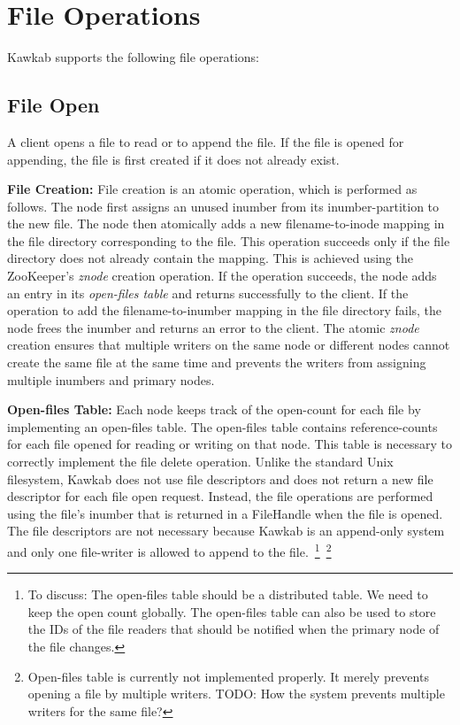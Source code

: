 \documentclass[]{article}
\newcommand{\subtopic}[1]{\vspace{1.5pt} \noindent \textbf{#1}}
\newcommand{\hl}[1]{\textcolor{hlcolor}{#1}}
\begin{document}
\section{File Operations}

Kawkab supports the following file operations:

\subsection{File Open}

A client opens a file to read or to append the file. If the file is opened for
appending, the file is first created if it does not already exist.

\subtopic{File Creation:} File creation is an atomic operation, which is
performed as follows.
The node first assigns an unused inumber from its inumber-partition to the new
file.  The node then atomically adds a new filename-to-inode mapping in the
file directory corresponding to the file. This operation succeeds only if the
file directory does not already contain the mapping. This is achieved using the
ZooKeeper's \textit{znode} creation operation.  If the operation succeeds, the
node adds an entry in its \textit{open-files table} and returns successfully to
the client.  If the operation to add the filename-to-inumber mapping in the
file directory fails, the node frees the inumber and returns an error to the
client.  The atomic \textit{znode} creation ensures that multiple writers on
the same node or different nodes cannot create the same file at the same time
and prevents the writers from assigning multiple inumbers and primary nodes.


\subtopic{Open-files Table:} Each node keeps track of the open-count for each
file by implementing an open-files table.  The open-files table contains
reference-counts for each file opened for reading or writing on that node.
This table is necessary to correctly implement the file delete operation.
Unlike the standard Unix filesystem, Kawkab does not use file descriptors and
does not return a new file descriptor for each file open request.  Instead, the
file operations are performed using the file's inumber that is returned in a
FileHandle when the file is opened.  The file descriptors are not necessary
because Kawkab is an append-only system and only one file-writer is allowed to
append to the file.~\footnote{\hl{To discuss: The open-files table should be a
distributed table. We need to keep the open count globally. The open-files
table can also be used to store the IDs of the file readers that should be
notified when the primary node of the file changes.}}~\footnote{Open-files
table is currently not implemented properly. It merely prevents opening
a file by multiple writers. TODO: How the system prevents multiple writers
for the same file?}
\end{document}
